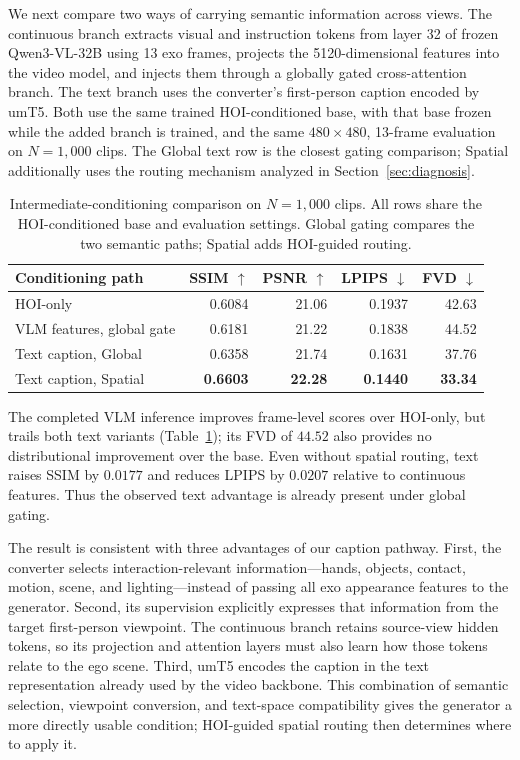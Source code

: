 \documentclass{article} %
\begin{document}
We next compare two ways of carrying semantic information across views.
The continuous branch extracts visual and instruction tokens from layer 32
of frozen Qwen3-VL-32B using 13 exo frames, projects the 5120-dimensional
features into the video model, and injects them through a globally gated
cross-attention branch. The text branch uses the converter's first-person
caption encoded by umT5. Both use the same trained HOI-conditioned base,
with that base frozen while the added branch is trained, and the same
$480\times480$, 13-frame evaluation on $N{=}1{,}000$ clips.
The Global text row is the closest gating comparison; Spatial additionally
uses the routing mechanism analyzed in Section~\ref{sec:diagnosis}.

\begin{table}[h]
\centering
\footnotesize
\caption{Intermediate-conditioning comparison on $N{=}1{,}000$ clips.
All rows share the HOI-conditioned base and evaluation settings.
Global gating compares the two semantic paths; Spatial adds HOI-guided routing.}
\label{tab:modality}
\begin{tabular}{lrrrr}
\toprule
Conditioning path & SSIM $\uparrow$ & PSNR $\uparrow$ & LPIPS $\downarrow$ & FVD $\downarrow$ \\
\midrule
HOI-only & 0.6084 & 21.06 & 0.1937 & 42.63 \\
VLM features, global gate & 0.6181 & 21.22 & 0.1838 & 44.52 \\
Text caption, Global & 0.6358 & 21.74 & 0.1631 & 37.76 \\
Text caption, Spatial & \textbf{0.6603} & \textbf{22.28} & \textbf{0.1440} & \textbf{33.34} \\
\bottomrule
\end{tabular}
\end{table}

The completed VLM inference improves frame-level scores over HOI-only,
but trails both text variants (Table~\ref{tab:modality}); its FVD of
$44.52$ also provides no distributional improvement over the base.
Even without spatial routing, text raises SSIM by $0.0177$ and reduces
LPIPS by $0.0207$ relative to continuous features.
Thus the observed text advantage is already present under global gating.

The result is consistent with three advantages of our caption pathway.
First, the converter selects interaction-relevant information---hands,
objects, contact, motion, scene, and lighting---instead of passing all exo
appearance features to the generator. Second, its supervision explicitly
expresses that information from the target first-person viewpoint. The
continuous branch retains source-view hidden tokens, so its projection and
attention layers must also learn how those tokens relate to the ego scene.
Third, umT5 encodes the caption in the text representation already used by
the video backbone. This combination of semantic selection, viewpoint
conversion, and text-space compatibility gives the generator a more directly
usable condition; HOI-guided spatial routing then determines where to apply
it.
\end{document}
